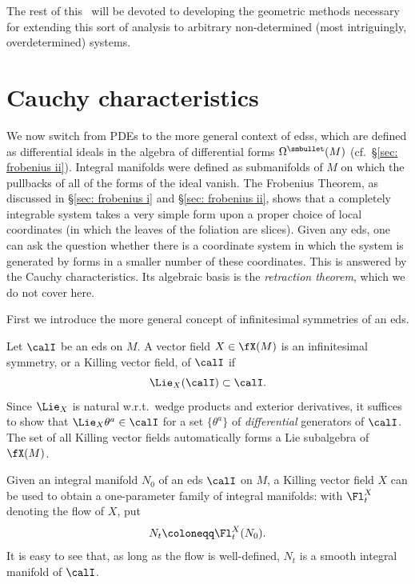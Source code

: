 The rest of this \chap\ will be devoted to developing the geometric methods necessary for extending this sort of analysis to arbitrary non-determined (most intriguingly, overdetermined) systems.










\section{Cauchy characteristics}


We now switch from PDEs to the more general context of \glspl{eds}, which are defined as differential ideals in the algebra of differential forms $\Omega^{\smbullet}(M)$ (cf.~\S\ref{sec: frobenius ii}). Integral manifolds were defined as submanifolds of $M$ on which the pullbacks of all of the forms of the ideal vanish. The Frobenius Theorem, as discussed in \S\ref{sec: frobenius i} and \S\ref{sec: frobenius ii}, shows that a completely integrable system takes a very simple form upon a proper choice of local coordinates (in which the leaves of the foliation are slices). Given any \gls{eds}, one can ask the question whether there is a coordinate system in which the system is generated by forms in a smaller number of these coordinates. This is answered by the Cauchy characteristics. Its algebraic basis is the \emph{retraction theorem}, which we do not cover here.

First we introduce the more general concept of infinitesimal symmetries of an \gls{eds}.

\begin{defn}
    Let $\calI$ be an \gls{eds} on $M$. A vector field $X\in\fX(M)$ is an infinitesimal symmetry, or a Killing vector field, of $\calI$ if 
    \[\Lie_X (\calI)\subset \calI.\]
    Since $\Lie_X$ is natural w.r.t.\ wedge products and exterior derivatives, it suffices to show that $\Lie_X \theta^a\in \calI$ for a set $\{\theta^a\}$ of \emph{differential} generators of $\calI$. The set of all Killing vector fields automatically forms a Lie subalgebra of $\fX(M)$.
\end{defn}

Given an integral manifold $N_0$ of an \gls{eds} $\calI$ on $M$, a Killing vector field $X$ can be used to obtain a one-parameter family of integral manifolds: with $\Fl^X_t$ denoting the flow of $X$, put
\[N_t\coloneqq \Fl^X_t(N_0).\label{eq 7.3 Ivey}\]
It is easy to see that, as long as the flow is well-defined, $N_t$ is a smooth integral manifold of $\calI$. 

